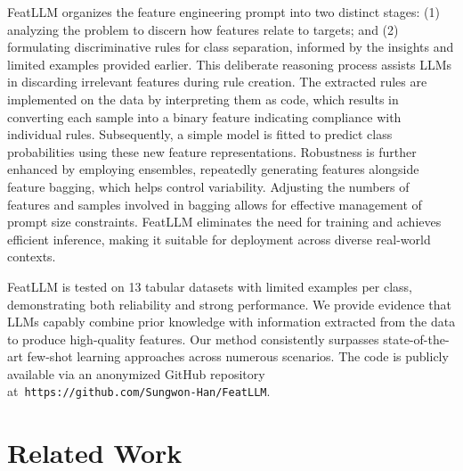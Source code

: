 \textsf{FeatLLM} organizes the feature engineering prompt into two distinct stages: (1) analyzing the problem to discern how features relate to targets; and (2) formulating discriminative rules for class separation, informed by the insights and limited examples provided earlier. This deliberate reasoning process assists LLMs in discarding irrelevant features during rule creation. The extracted rules are implemented on the data by interpreting them as code, which results in converting each sample into a binary feature indicating compliance with individual rules. Subsequently, a simple model is fitted to predict class probabilities using these new feature representations. Robustness is further enhanced by employing ensembles, repeatedly generating features alongside feature bagging, which helps control variability. Adjusting the numbers of features and samples involved in bagging allows for effective management of prompt size constraints. \textsf{FeatLLM} eliminates the need for training and achieves efficient inference, making it suitable for deployment across diverse real-world contexts.

\textsf{FeatLLM} is tested on 13 tabular datasets with limited examples per class, demonstrating both reliability and strong performance. We provide evidence that LLMs capably combine prior knowledge with information extracted from the data to produce high-quality features. Our method consistently surpasses state-of-the-art few-shot learning approaches across numerous scenarios. The code is publicly available via an anonymized GitHub repository at~\texttt{https://github.com/Sungwon-Han/FeatLLM}.

\section{Related Work}

